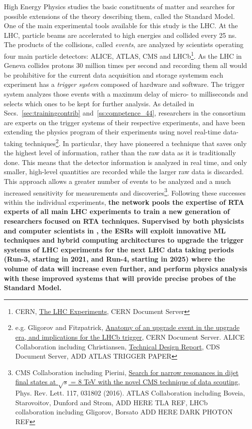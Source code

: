 High Energy Physics studies the basic constituents of matter and searches for possible extensions of the theory describing them, called the Standard Model. 
One of the main experimental tools available for this study is the LHC. 
At the LHC, particle beams are accelerated to high energies and collided every 25 ns.
The products of the collisions, called \textit{events}, are analyzed by scientists operating four main particle detectors: ALICE, ATLAS, CMS and LHCb\footnote{CERN, \href{http://cds.cern.ch/record/1997374}{The LHC Experiments}, CERN Document Server}.
As the LHC in Geneva collides protons 30 million times per second and recording them all would be prohibitive for the current data acquisition and storage systemsm 
each experiment has a \textit{trigger system} composed of hardware and software.
The trigger system analyzes those events with a maximum delay of micro- to milliseconds and selects which ones to be kept for further analysis. 
As detailed in Secs.~\ref{sec:trainingcontrib} and~\ref{ss:competence_44}, researchers in the \acronym consortium are experts on the trigger systems of their respective experiments, and have been extending the physics program of their experiments using novel real-time data-taking techniques\footnote{e.g. Gligorov and Fitzpatrick, \href{http://cds.cern.ch/record/1670985}{Anatomy of an upgrade event in the upgrade era, and implications for the LHCb trigger}, CERN Document Server. ALICE Collaboration including Christiansen, \href{https://cds.cern.ch/record/2011297/files/ALICE-TDR-019.pdf}{Technical Design Report}, CDS Document Server, ADD ATLAS TRIGGER PAPER}. 
In particular, they have pioneered a technique that saves only the highest level of information, rather than the raw data as it is traditionally done. 
This means that the detector information is analyzed in real time, and only smaller, high-level quantities are recorded while the larger raw data is discarded. 
This approach allows a greater number of events to be analyzed and a much increased sensitivity for measurements and discoveries\footnote{CMS Collaboration including Pierini, \href{https://arxiv.org/abs/1604.08907}{Search for narrow resonances in dijet final states at $\sqrt{s}$ = 8 TeV with the novel CMS technique of data scouting}, Phys. Rev. Lett. 117, 031802 (2016). ATLAS Collaboration including Boveia, Starovoitov, Dunford and Strom, ADD HERE TLA REF, LHCb collaboration including Gligorov, Borsato ADD HERE DARK PHOTON REF}.
Following these successes within the individual experiments, \textbf{the \acronym network pools the expertise of RTA experts of all main LHC experiments to train a new generation of researchers focused on RTA techniques. Supervised by both physicists and computer scientists in \acronym, the ESRs will exploit innovative ML techniques and hybrid computing architectures to upgrade the trigger systems of LHC experiments for the next LHC data taking periods (Run-3, starting in 2021, and Run-4, starting in 2025) where the volume of data will increase even further, and perform physics analysis with these improved systems that will provide precise probes of the Standard Model.} 

